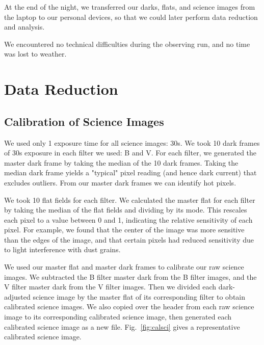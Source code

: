 \documentclass[twocolumn]{aastex631}
\begin{document}
At the end of the night, we transferred our darks, flats, and science images from the laptop to our personal devices, so that we could later perform data reduction and analysis.

We encountered no technical difficulties during the observing run, and no time was lost to weather.


\section{Data Reduction \label{sec:reduction}}


\subsection{Calibration of Science Images \label{subsec:calibsci}}

We used only 1 exposure time for all science images: 30s. We took 10 dark frames of 30s exposure in each filter we used: B and V. For each filter, we generated the master dark frame by taking the median of the 10 dark frames. Taking the median dark frame yields a "typical" pixel reading (and hence dark current) that excludes outliers. From our master dark frames we can identify hot pixels.

We took 10 flat fields for each filter. We calculated the master flat for each filter by taking the median of the flat fields and dividing by its mode. This rescales each pixel to a value between 0 and 1, indicating the relative sensitivity of each pixel. For example, we found that the center of the image was more sensitive than the edges of the image, and that certain pixels had reduced sensitivity due to light interference with dust grains.

We used our master flat and master dark frames to calibrate our raw science images. We subtracted the B filter master dark from the B filter images, and the V filter master dark from the V filter images. Then we divided each dark-adjusted science image by the master flat of its corresponding filter to obtain calibrated science images. We also copied over the header from each raw science image to its corresponding calibrated science image, then generated each calibrated science image as a new file. Fig.\ \ref{fig:calsci} gives a representative calibrated science image.
\end{document}
